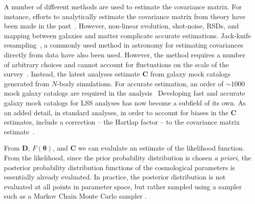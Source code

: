 A number of different methods are used to estimate the covariance matrix. For instance, 
efforts to analytically estimate the covariance matrix from theory have been made in 
the past~\citep{Hamilton:2006aa, Pope:2008aa, dePutter:2012aa}. However, 
non-linear evolution, shot-noise, RSDs, and mapping between galaxies and matter
complicate accurate estimations. Jack-knife resampling~\citep{Shao:1995aa}, 
a commonly used method in astronomy for estimating covariances directly from data 
have also been used. However, the method requires a number of arbitrary choices 
and cannot account for fluctuations on the scale of the survey~\citep{Norberg:2009aa}.
Instead, the latest analyses estimate $\bm{C}$ from galaxy mock catalogs generated 
from $N$-body simulations. For accurate estimation, an order of $\sim 1000$ mock
galaxy catalogs are required in the analysis~\citep{Scoccimarro:2002aa, McBridge:2011aa, 
Anderson:2012aa, Manera:2013aa, Rodriguez-Torres:2015aa, Kitaura:2016aa, Beutler:2016aa}
Developing fast and accurate galaxy mock catalogs for LSS analyses has now become a 
subfield of its own. As an added detail, in standard analyses, in order to 
account for biases in the $\bm{C}$ estimates, include a correction -- the Hartlap factor -- 
to the covariance matrix estimate~\citep{hartlap2007}.

From $\bm{D}$, $F(\bm{\theta})$, and $\bm{C}$ we can evalulate an estimate of the 
likelihood function. From the likelihood,
since the prior probability distribution is chosen {\em a priori}, the posterior 
probability distribution functions of the cosmological parameters is essentially already 
evaluated. In practice, the posterior distribution is not evaluated at all points in 
parameter space, but rather sampled using a sampler such as a Markov Chain Monte 
Carlo sampler \citep[\emph{e.g.} $\mathtt{emcee}$][]{emcee}.

